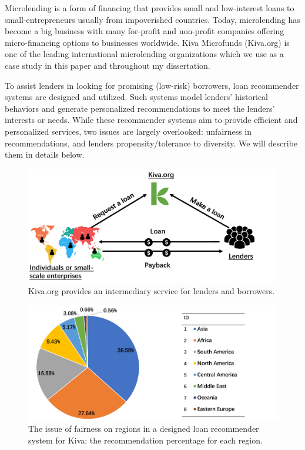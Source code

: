 Microlending is a form of financing that provides small and low-interest loans to small-entrepreneurs usually from impoverished countries. Today, microlending has become a big business with many for-profit and non-profit companies offering micro-financing options to businesses worldwide. Kiva Microfunds (Kiva.org) is one of the leading international microlending organizations which we use as a case study in this paper and throughout my dissertation.

To assist lenders in looking for promising (low-risk) borrowers, loan recommender systems \cite{choo2014gather,choo2014understanding} are designed and utilized. Such systems model lenders' historical behaviors and generate personalized recommendations to meet the lenders' interests or needs. While these recommender systems aim to provide efficient and personalized services, two issues are largely overlooked: unfairness in recommendations, and lenders propensity/tolerance to diversity. We will describe them in details below. 

\begin{figure}[htb]
\includegraphics[width=0.98\columnwidth]{imgs/far/microlending.png}
\caption{Kiva.org provides an intermediary service for lenders and borrowers.}
\label{fig:kiva_process}
\end{figure}

\begin{figure}[htb]
\includegraphics[width=0.98\columnwidth]{imgs/far/kiva.png}
\caption{The issue of fairness on regions in a designed loan recommender system \cite{choo2014gather} for Kiva: the recommendation percentage for each region.}
\label{fig:recom_result}
\end{figure}

